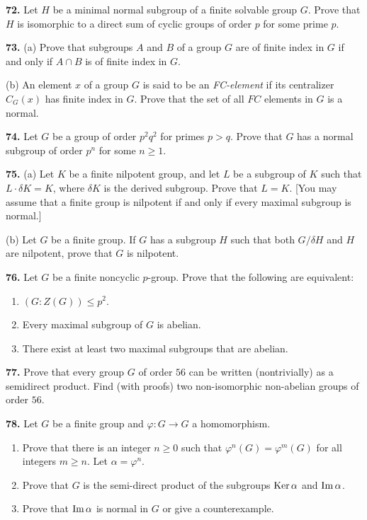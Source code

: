 \documentclass[a4paper,11pt,final,openany]{memoir}%
\theoremstyle{nonumberplain}
\begin{document}
\medskip\noindent\textbf{72.} Let $H$ be a minimal normal subgroup of a finite
solvable group $G$. Prove that $H$ is isomorphic to a direct sum of cyclic
groups of order $p$ for some prime $p$.

\medskip\noindent\textbf{73.} (a) Prove that subgroups $A$ and $B$ of a group
$G$ are of finite index in $G$ if and only if $A\cap B$ is of finite index in
$G$.

\noindent(b) An element $x$ of a group $G$ is said to be an
\textit{FC-element\/} if its centralizer $C_{G}(x)$ has finite index in $G$.
Prove that the set of all $FC$ elements in $G$ is a normal.

\medskip\noindent\textbf{74.} Let $G$ be a group of order $p^{2}q^{2}$ for
primes $p>q$. Prove that $G$ has a normal subgroup of order $p^{n}$ for some
$n\geq1$.

\medskip\noindent\textbf{75.} (a) Let $K$ be a finite nilpotent group, and let
$L$ be a subgroup of $K$ such that $L\cdot\delta K=K$, where $\delta K$ is the
derived subgroup. Prove that $L=K$. [You may assume that a finite group is
nilpotent if and only if every maximal subgroup is normal.]

\noindent(b) Let $G$ be a finite group. If $G$ has a subgroup $H$ such that
both $G/\delta H$ and $H$ are nilpotent, prove that $G$ is nilpotent.

\medskip\noindent\textbf{76.} Let $G$ be a finite noncyclic $p$-group. Prove
that the following are equivalent:

\begin{enumerate}
\item $(G:Z(G))\leq p^{2}$.

\item Every maximal subgroup of $G$ is abelian.

\item There exist at least two maximal subgroups that are abelian.
\end{enumerate}

\medskip\noindent\textbf{77.} Prove that every group $G$ of order $56$ can be
written (nontrivially) as a semidirect product. Find (with proofs) two
non-isomorphic non-abelian groups of order $56$.

\medskip\noindent\textbf{78.} Let $G$ be a finite group and $\varphi
:G\rightarrow G$ a homomorphism.

\begin{enumerate}
\item Prove that there is an integer $n\geq0$ such that $\varphi
^{n}(G)=\varphi^{m}(G)$ for all integers $m\geq n$. Let $\alpha=\varphi^{n} $.

\item Prove that $G$ is the semi-direct product of the subgroups $\operatorname{Ker}\alpha$
and $\operatorname{Im}\alpha$.

\item Prove that $\operatorname{Im}\alpha$ is normal in $G$ or give a counterexample.
\end{enumerate}
\end{document}
